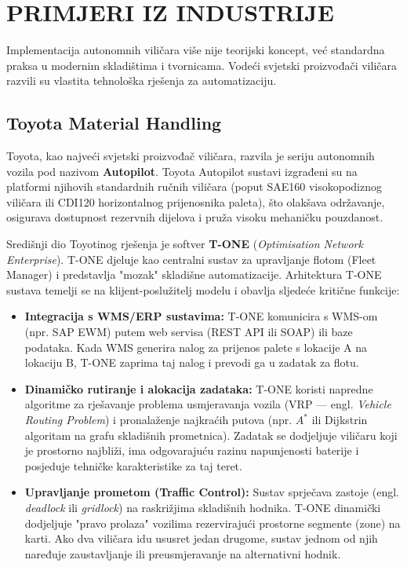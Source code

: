\documentclass[12pt,a4paper]{article}
\begin{document}
\section{PRIMJERI IZ INDUSTRIJE}
Implementacija autonomnih viličara više nije teorijski koncept, već standardna praksa u modernim skladištima i tvornicama. Vodeći svjetski proizvođači viličara razvili su vlastita tehnološka rješenja za automatizaciju.

\subsection{Toyota Material Handling}
Toyota, kao najveći svjetski proizvođač viličara, razvila je seriju autonomnih vozila pod nazivom \textbf{Autopilot}. Toyota Autopilot sustavi izgrađeni su na platformi njihovih standardnih ručnih viličara (poput SAE160 visokopodiznog viličara ili CDI120 horizontalnog prijenosnika paleta), što olakšava održavanje, osigurava dostupnost rezervnih dijelova i pruža visoku mehaničku pouzdanost.

Središnji dio Toyotinog rješenja je softver \textbf{T-ONE} (\textit{Optimisation Network Enterprise}). T-ONE djeluje kao centralni sustav za upravljanje flotom (Fleet Manager) i predstavlja "mozak" skladišne automatizacije. Arhitektura T-ONE sustava temelji se na klijent-poslužitelj modelu i obavlja sljedeće kritične funkcije:
\begin{itemize}
    \item \textbf{Integracija s WMS/ERP sustavima:} T-ONE komunicira s WMS-om (npr. SAP EWM) putem web servisa (REST API ili SOAP) ili baze podataka. Kada WMS generira nalog za prijenos palete s lokacije A na lokaciju B, T-ONE zaprima taj nalog i prevodi ga u zadatak za flotu.
    \item \textbf{Dinamičko rutiranje i alokacija zadataka:} T-ONE koristi napredne algoritme za rješavanje problema usmjeravanja vozila (VRP — engl. \textit{Vehicle Routing Problem}) i pronalaženje najkraćih putova (npr. $A^*$ ili Dijkstrin algoritam na grafu skladišnih prometnica). Zadatak se dodjeljuje viličaru koji je prostorno najbliži, ima odgovarajuću razinu napunjenosti baterije i posjeduje tehničke karakteristike za taj teret.
    \item \textbf{Upravljanje prometom (Traffic Control):} Sustav sprječava zastoje (engl. \textit{deadlock} ili \textit{gridlock}) na raskrižjima skladišnih hodnika. T-ONE dinamički dodjeljuje "pravo prolaza" vozilima rezervirajući prostorne segmente (zone) na karti. Ako dva viličara idu ususret jedan drugome, sustav jednom od njih naređuje zaustavljanje ili preusmjeravanje na alternativni hodnik.
\end{itemize}
\end{document}
